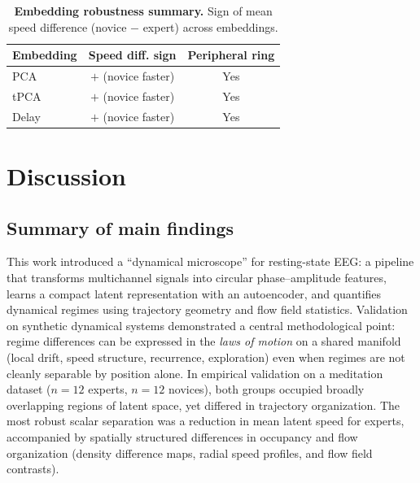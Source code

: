 \documentclass[5p,twocolumn,authoryear]{elsarticle}
\begin{document}
\begin{table}[h]
\centering
\caption{\textbf{Embedding robustness summary.} Sign of mean speed difference (novice $-$ expert) across embeddings.}
\label{tab:embedding_robustness}
\begin{tabular}{lcc}
\toprule
Embedding & Speed diff. sign & Peripheral ring \\
\midrule
PCA & $+$ (novice faster) & Yes \\
tPCA & $+$ (novice faster) & Yes \\
Delay & $+$ (novice faster) & Yes \\
\bottomrule
\end{tabular}
\end{table}


\section{Discussion}
\label{sec:discussion}

\subsection{Summary of main findings}
This work introduced a ``dynamical microscope'' for resting-state EEG: a pipeline that transforms multichannel signals into circular phase--amplitude features, learns a compact latent representation with an autoencoder, and quantifies dynamical regimes using trajectory geometry and flow field statistics. Validation on synthetic dynamical systems demonstrated a central methodological point: regime differences can be expressed in the \emph{laws of motion} on a shared manifold (local drift, speed structure, recurrence, exploration) even when regimes are not cleanly separable by position alone. In empirical validation on a meditation dataset ($n=12$ experts, $n=12$ novices), both groups occupied broadly overlapping regions of latent space, yet differed in trajectory organization. The most robust scalar separation was a reduction in mean latent speed for experts, accompanied by spatially structured differences in occupancy and flow organization (density difference maps, radial speed profiles, and flow field contrasts).
\end{document}
